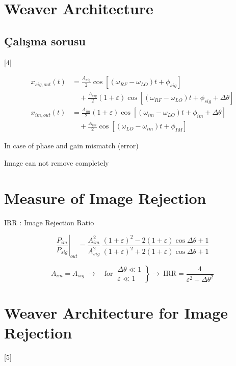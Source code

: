 \documentclass[11pt,a4paper]{article}
\begin{document}
\section{Weaver Architecture}

\subsection{Çalışma sorusu}

[4]

\begin{align*}
x_{sig,out}(t) &= \frac{A_{sig}}{2}\cos[(\omega_{RF}-\omega_{LO})t+\phi_{sig}]\\
&\quad+\frac{A_{sig}}{2}(1+\varepsilon)\cos[(\omega_{RF}-\omega_{LO})t+\phi_{sig}+\Delta\theta]\\
x_{im,out}(t) &= \frac{A_{im}}{2}(1+\varepsilon)\cos[(\omega_{im}-\omega_{LO})t+\phi_{im}+\Delta\theta]\\
&\quad+\frac{A_{im}}{2}\cos[(\omega_{LO}-\omega_{im})t+\phi_{IM}]
\end{align*}

In case of phase and gain mismatch (error)

Image can not remove completely

\section{Measure of Image Rejection}

\textcolor{kirmizikalem}{IRR : Image Rejection Ratio}

\[ \left.\frac{P_{im}}{P_{sig}}\right|_{out} = \frac{A_{im}^{2}}{A_{sig}^{2}}\,\frac{(1+\varepsilon)^{2}-2(1+\varepsilon)\cos\Delta\theta+1}{(1+\varepsilon)^{2}+2(1+\varepsilon)\cos\Delta\theta+1} \]

\[ A_{im}=A_{sig}\ \rightarrow\quad \text{for}\ \left.\begin{matrix}\Delta\theta\ll 1\\ \varepsilon\ll 1\end{matrix}\right\}\rightarrow\ \mathrm{IRR}=\frac{4}{\varepsilon^{2}+\Delta\theta^{2}} \]

\section{Weaver Architecture for Image Rejection}

[5]
\end{document}
